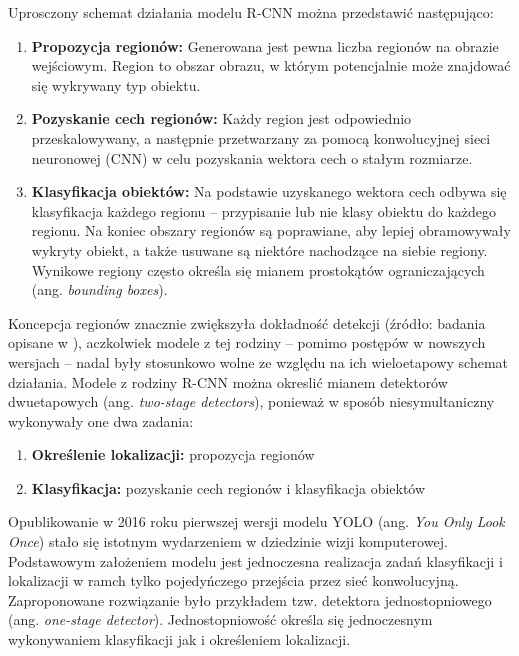 Uprosczony schemat działania modelu R-CNN można przedstawić następująco:
\begin{enumerate}
    \item \textbf{Propozycja regionów:} Generowana jest pewna liczba regionów na obrazie wejściowym. Region to obszar obrazu, w którym potencjalnie może znajdować się wykrywany typ obiektu.
    \item \textbf{Pozyskanie cech regionów:} Każdy region jest odpowiednio przeskalowywany, a następnie przetwarzany za pomocą konwolucyjnej sieci neuronowej (CNN) w celu pozyskania wektora cech o stałym rozmiarze.
    \item \textbf{Klasyfikacja obiektów:} Na podstawie uzyskanego wektora cech odbywa się klasyfikacja każdego regionu -- przypisanie lub nie klasy obiektu do każdego regionu. Na koniec obszary regionów są poprawiane, aby lepiej obramowywały wykryty obiekt, a także usuwane są niektóre nachodzące na siebie regiony. Wynikowe regiony często określa się mianem prostokątów ograniczających (ang. \emph{bounding boxes}).
\end{enumerate}

 Koncepcja regionów znacznie zwiększyła dokładność detekcji (źródło: badania opisane w \cite{RCNN, Fast-RCNN, Faster-RCNN}), aczkolwiek modele z tej rodziny -- pomimo postępów w nowszych wersjach -- nadal były stosunkowo wolne ze względu na ich wieloetapowy schemat działania. Modele z rodziny R-CNN można okreslić mianem detektorów dwuetapowych (ang. \emph{two-stage detectors}), ponieważ w sposób niesymultaniczny wykonywały one dwa zadania:
\begin{enumerate}
    \item \textbf{Określenie lokalizacji:} propozycja regionów
    \item \textbf{Klasyfikacja:} pozyskanie cech regionów i klasyfikacja obiektów
\end{enumerate}

Opublikowanie w 2016 roku pierwszej wersji modelu YOLO (ang. \emph{You Only Look Once}) \cite{yolo_pierwszy_artykul} stało się istotnym wydarzeniem w dziedzinie wizji komputerowej. Podstawowym założeniem modelu jest jednoczesna realizacja zadań klasyfikacji i lokalizacji w ramch tylko pojedyńczego przejścia przez sieć konwolucyjną.  
Zaproponowane rozwiązanie było przykładem tzw. detektora jednostopniowego (ang. \emph{one-stage detector}). Jednostopniowość określa się jednoczesnym wykonywaniem klasyfikacji jak i określeniem lokalizacji.


